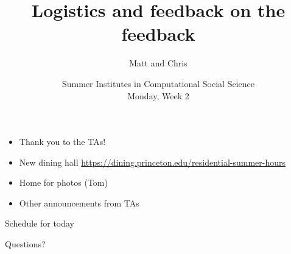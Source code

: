 \documentclass{beamer}
\title[]{Logistics and feedback on the feedback}
\author[]{Matt and Chris}
\date[]{Summer Institutes in Computational Social Science\\Monday, Week 2}
\begin{document}
\frame{\titlepage}
\begin{frame}

\begin{itemize}
\item Thank you to the TAs!
\pause
\item New dining hall  \url{https://dining.princeton.edu/residential-summer-hours}
\pause
\item Home for photos (Tom)
\pause
\item Other announcements from TAs
\end{itemize}

\end{frame}
\begin{frame}

Schedule for today

\end{frame}
\begin{frame}

\begin{center}
\LARGE
Questions?
\end{center}

\end{frame}
\end{document}

